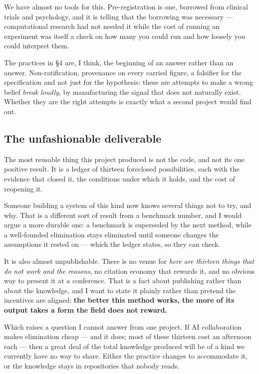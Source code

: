 We have almost no tools for this. Pre-registration is one, borrowed from clinical trials and psychology, and it is telling that the borrowing was necessary --- computational research had not needed it while the cost of running an experiment was itself a check on how many you could run and how loosely you could interpret them.

The practices in \S4 are, I think, the beginning of an answer rather than an answer. Non-ratification, provenance on every carried figure, a falsifier for the specification and not just for the hypothesis: these are attempts to make a wrong belief \textit{break loudly}, by manufacturing the signal that does not naturally exist. Whether they are the right attempts is exactly what a second project would find out.

\subsection{The unfashionable deliverable}

The most reusable thing this project produced is not the code, and not its one positive result. It is a ledger of thirteen foreclosed possibilities, each with the evidence that closed it, the conditions under which it holds, and the cost of reopening it.

Someone building a system of this kind now knows several things not to try, and why. That is a different sort of result from a benchmark number, and I would argue a more durable one: a benchmark is superseded by the next method, while a well-founded elimination stays eliminated until someone changes the assumptions it rested on --- which the ledger states, so they can check.

It is also almost unpublishable. There is no venue for \textit{here are thirteen things that do not work and the reasons}, no citation economy that rewards it, and no obvious way to present it at a conference. That is a fact about publishing rather than about the knowledge, and I want to state it plainly rather than pretend the incentives are aligned: \textbf{the better this method works, the more of its output takes a form the field does not reward.}

Which raises a question I cannot answer from one project. If AI collaboration makes elimination cheap --- and it does; most of these thirteen cost an afternoon each --- then a great deal of the total knowledge produced will be of a kind we currently have no way to share. Either the practice changes to accommodate it, or the knowledge stays in repositories that nobody reads.

